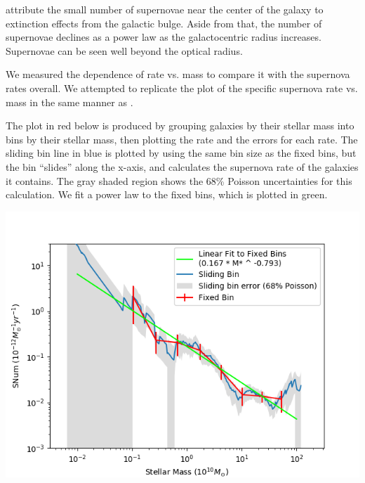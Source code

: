 \documentclass[apj]{emulateapj}
\begin{document}
\citet{Leaman11} attribute the small number of supernovae near the center of the galaxy to extinction effects from the galactic bulge. Aside from that, the number of supernovae declines as a power law as the galactocentric radius increases. Supernovae can be seen well beyond the optical radius.

We measured the dependence of rate vs. mass to compare it with the supernova rates overall. We attempted to replicate the plot of the specific supernova rate vs. mass in the same manner as \citet{Graur17}.

The plot in red below is produced by grouping galaxies by their stellar mass into bins by their stellar mass, then plotting the rate and the errors for each rate. The sliding bin line in blue is plotted by using the same bin size as the fixed bins, but the bin “slides” along the x-axis, and calculates the supernova rate of the galaxies it contains. The gray shaded region shows the 68\% Poisson uncertainties for this calculation. We fit a power law to the fixed bins, which is plotted in green.

\includegraphics[scale=0.5]{outskirts_sn_rate_vs_mass}
\end{document}
